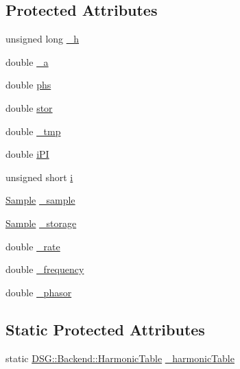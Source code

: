 \subsection*{Protected Attributes}
\begin{DoxyCompactItemize}
\item 
unsigned long \hyperlink{classDSG_1_1FourierSaw_afaa437e6dda9ddbd4f011012dfe3c55a}{\+\_\+h}
\item 
double \hyperlink{classDSG_1_1FourierSaw_a3d0becee69448318f53e65161a1071d5}{\+\_\+a}
\item 
double \hyperlink{classDSG_1_1FourierSaw_a3a743cafd72c9a0996c90db106607845}{phs}
\item 
double \hyperlink{classDSG_1_1FourierSaw_a2e47297223e95f05e614d8beb81075b3}{stor}
\item 
double \hyperlink{classDSG_1_1FourierSaw_a19a50ea8b1082851c88882c5ef555bcd}{\+\_\+tmp}
\item 
double \hyperlink{classDSG_1_1FourierSaw_a07bf8dae076cf479503f4cd3dd413dc6}{i\+P\+I}
\item 
unsigned short \hyperlink{classDSG_1_1FourierSaw_ad4fecfc1b1500bc514fb2d9e794ef411}{i}
\item 
\hyperlink{classDSG_1_1Sample}{Sample} \hyperlink{classDSG_1_1FourierGenerator_ab96bed1cd59c42e82a689036e5c62bef}{\+\_\+sample}
\item 
\hyperlink{classDSG_1_1Sample}{Sample} \hyperlink{classDSG_1_1FourierGenerator_a6b7f2439b26914cc9df6b6975a2cedac}{\+\_\+storage}
\item 
double \hyperlink{classDSG_1_1SignalGenerator_aa10f6c85d9adee901139ea7fb346f39d}{\+\_\+rate}
\item 
double \hyperlink{classDSG_1_1SignalGenerator_a67e296e3506dcdf09402c667cddff9ac}{\+\_\+frequency}
\item 
double \hyperlink{classDSG_1_1SignalGenerator_ac2271b582bf699275f077ecb642a8cd9}{\+\_\+phasor}
\end{DoxyCompactItemize}
\subsection*{Static Protected Attributes}
\begin{DoxyCompactItemize}
\item 
static \hyperlink{classDSG_1_1Backend_1_1HarmonicTable}{D\+S\+G\+::\+Backend\+::\+Harmonic\+Table} \hyperlink{classDSG_1_1FourierGenerator_aedac2cf90997418836d064c90540249d}{\+\_\+harmonic\+Table}
\end{DoxyCompactItemize}


